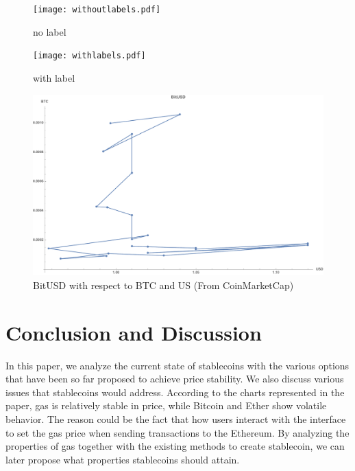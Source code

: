 \begin{figure}[!htb]
	\texttt{[image: withoutlabels.pdf]}
	\caption{no label}\label{fig:cad1}
	\endminipage\hfill
	\texttt{[image: withlabels.pdf]}
	\caption{with label}\label{fig:eur1}
	\endminipage\hfill
	\includegraphics[width=\linewidth]{figures/BitUSD_CoinMarket.pdf}
	\caption{BitUSD with respect to BTC and US (From CoinMarketCap)}\label{fig:bitusd3}
	\endminipage\hfill
\end{figure}

\section{Conclusion and Discussion}
In this paper, we analyze the current state of stablecoins with the various options that have been so far proposed to achieve price stability. We also discuss various issues that stablecoins would address. According to the charts represented in the paper, gas is relatively stable in price, while Bitcoin and Ether show volatile behavior. The reason could be the fact that how users interact with the interface to set the gas price when sending transactions to the Ethereum. By analyzing the properties of gas together with the existing methods to create stablecoin, we can later propose what properties stablecoins should attain.


